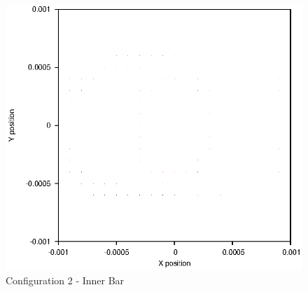 \documentclass[a4paper,12pt]{article}
\begin{document}
\begin{figure}[H]
\centering
\includegraphics[width=.9\textwidth]{./2016results/002-5-001/Inner.eps}
\caption{Configuration 2 - Inner Bar}
\label{fig:config2i}
\end{figure}
\end{document}
